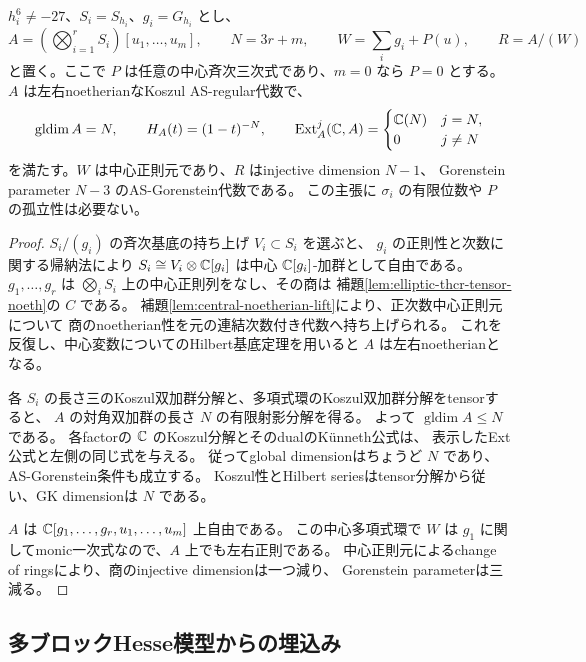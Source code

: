 \begin{proposition}[周囲のテンソル積]
\label{prop:tensor-sklyanin-ambient}
 \(h_i^6\ne-27\)、\(S_i=S_{h_i}\)、\(g_i=G_{h_i}\) とし、
 \[
 A=(\bigotimes_{i=1}^rS_i)[u_1,\ldots,u_m],\qquad
 N=3r+m,\qquad W=\sum_i g_i+P(u),\qquad R=A/(W)
 \]
 と置く。ここで \(P\) は任意の中心斉次三次式であり、\(m=0\) なら \(P=0\) とする。
 \(A\) は左右noetherianなKoszul AS-regular代数で、
 \[
 \operatorname{gldim}A=N,\qquad H_A(t)=(1-t)^{-N},\qquad
 \operatorname{Ext}^j_A(\mathbb C,A)=
 \begin{cases}\mathbb C(N)&j=N,\\0&j\ne N\end{cases}
 \]
 を満たす。\(W\) は中心正則元であり、\(R\) はinjective dimension \(N-1\)、
 Gorenstein parameter \(N-3\) のAS-Gorenstein代数である。
 この主張に \(\sigma_i\) の有限位数や \(P\) の孤立性は必要ない。
\end{proposition}
\begin{proof}
 \(S_i/(g_i)\) の斉次基底の持ち上げ \(V_i\subset S_i\) を選ぶと、
 \(g_i\) の正則性と次数に関する帰納法により
 \(S_i\cong V_i\otimes\mathbb C[g_i]\) は中心 \(\mathbb C[g_i]\)-加群として自由である。
 \(g_1,\ldots,g_r\) は \(\bigotimes_iS_i\) 上の中心正則列をなし、その商は
 補題\ref{lem:elliptic-thcr-tensor-noeth}の \(C\) である。
 補題\ref{lem:central-noetherian-lift}により、正次数中心正則元について
 商のnoetherian性を元の連結次数付き代数へ持ち上げられる。
 これを反復し、中心変数についてのHilbert基底定理を用いると \(A\) は左右noetherianとなる。

 各 \(S_i\) の長さ三のKoszul双加群分解と、多項式環のKoszul双加群分解をtensorすると、
 \(A\) の対角双加群の長さ \(N\) の有限射影分解を得る。
 よって \(\operatorname{gldim}A\le N\) である。
 各factorの \(\mathbb C\) のKoszul分解とそのdualのK\"unneth公式は、
 表示したExt公式と左側の同じ式を与える。
 従ってglobal dimensionはちょうど \(N\) であり、AS-Gorenstein条件も成立する。
 Koszul性とHilbert seriesはtensor分解から従い、GK dimensionは \(N\) である。

 \(A\) は \(\mathbb C[g_1,\ldots,g_r,u_1,\ldots,u_m]\) 上自由である。
 この中心多項式環で \(W\) は \(g_1\) に関してmonic一次式なので、\(A\) 上でも左右正則である。
 中心正則元によるchange of ringsにより、商のinjective dimensionは一つ減り、
 Gorenstein parameterは三減る。
\end{proof}

\subsection{多ブロックHesse模型からの埋込み}


